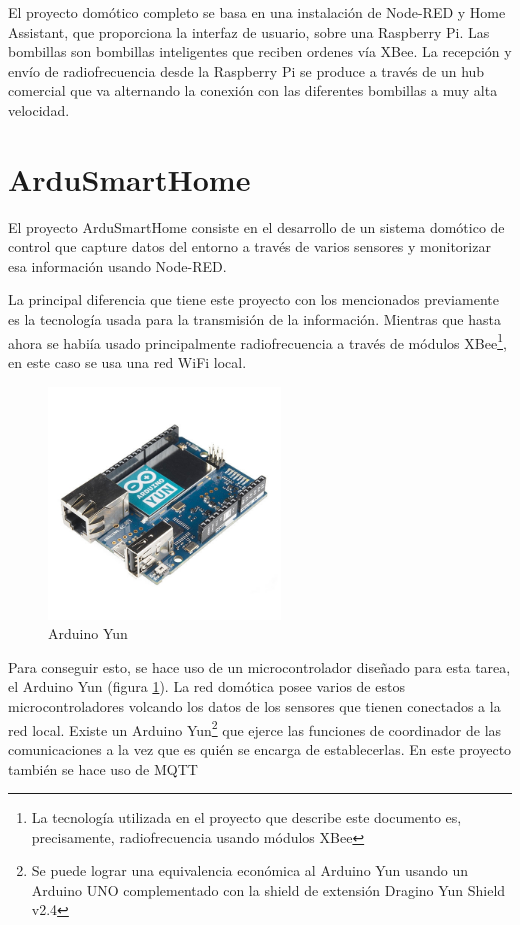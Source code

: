 El proyecto domótico completo se basa en una instalación de Node-RED y Home Assistant, que proporciona la interfaz de usuario, sobre una Raspberry Pi. Las bombillas son bombillas inteligentes que reciben ordenes vía XBee. La recepción y envío de radiofrecuencia desde la Raspberry Pi se produce a través de un hub comercial que va alternando la conexión con las diferentes bombillas a muy alta velocidad.

\section{ArduSmartHome \cite{UOC:2017}}

El proyecto ArduSmartHome consiste en el desarrollo de un sistema domótico de control que capture datos del entorno a través de varios sensores y monitorizar esa información usando Node-RED.

La principal diferencia que tiene este proyecto con los mencionados previamente es la tecnología usada para la transmisión de la información. Mientras que hasta ahora se habiía usado principalmente radiofrecuencia a través de módulos XBee\footnote{La tecnología utilizada en el proyecto que describe este documento es, precisamente, radiofrecuencia usando módulos XBee}, en este caso se usa una red WiFi local.

\begin{figure}[tb]
\centering
\includegraphics[width=0.55\textwidth]{figuras/EArte8.png}
\caption{Arduino Yun}
\label{fig:EArte8}
\end{figure}

Para conseguir esto, se hace uso de un microcontrolador diseñado para esta tarea, el Arduino Yun (figura \ref{fig:EArte8}). La red domótica posee varios de estos microcontroladores volcando los datos de los sensores que tienen conectados a la red local. Existe un Arduino Yun\footnote{Se puede lograr una equivalencia económica al Arduino Yun usando un Arduino UNO complementado con la shield de extensión Dragino Yun Shield v2.4} que ejerce las funciones de coordinador de las comunicaciones a la vez que es quién se encarga de establecerlas. En este proyecto también se hace uso de MQTT